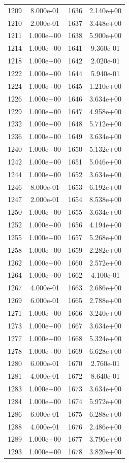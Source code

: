 \documentclass[12pt]{article}
\begin{document}
\begin{longtable}{@{}cccc@{}}
1209 & 8.000e-01 & 1636 & 2.140e+00 \\
1210 & 2.000e-01 & 1637 & 3.448e+00 \\
1211 & 1.000e+00 & 1638 & 5.900e+00 \\
1214 & 1.000e+00 & 1641 & 9.360e-01 \\
1218 & 1.000e+00 & 1642 & 2.020e-01 \\
1222 & 1.000e+00 & 1644 & 5.940e-01 \\
1224 & 1.000e+00 & 1645 & 1.210e+00 \\
1226 & 1.000e+00 & 1646 & 3.634e+00 \\
1229 & 1.000e+00 & 1647 & 4.958e+00 \\
1232 & 1.000e+00 & 1648 & 5.712e+00 \\
1236 & 1.000e+00 & 1649 & 3.634e+00 \\
1240 & 1.000e+00 & 1650 & 5.132e+00 \\
1242 & 1.000e+00 & 1651 & 5.046e+00 \\
1244 & 1.000e+00 & 1652 & 3.634e+00 \\
1246 & 8.000e-01 & 1653 & 6.192e+00 \\
1247 & 2.000e-01 & 1654 & 8.538e+00 \\
1250 & 1.000e+00 & 1655 & 3.634e+00 \\
1252 & 1.000e+00 & 1656 & 4.194e+00 \\
1255 & 1.000e+00 & 1657 & 5.268e+00 \\
1258 & 1.000e+00 & 1659 & 2.282e+00 \\
1262 & 1.000e+00 & 1660 & 2.572e+00 \\
1264 & 1.000e+00 & 1662 & 4.100e-01 \\
1267 & 4.000e-01 & 1663 & 2.686e+00 \\
1269 & 6.000e-01 & 1665 & 2.788e+00 \\
1271 & 1.000e+00 & 1666 & 3.240e+00 \\
1273 & 1.000e+00 & 1667 & 3.634e+00 \\
1277 & 1.000e+00 & 1668 & 5.324e+00 \\
1278 & 1.000e+00 & 1669 & 6.628e+00 \\
1280 & 6.000e-01 & 1670 & 2.760e-01 \\
1281 & 4.000e-01 & 1672 & 8.640e-01 \\
1283 & 1.000e+00 & 1673 & 3.634e+00 \\
1284 & 1.000e+00 & 1674 & 5.972e+00 \\
1286 & 6.000e-01 & 1675 & 6.288e+00 \\
1288 & 4.000e-01 & 1676 & 2.486e+00 \\
1289 & 1.000e+00 & 1677 & 3.796e+00 \\
1293 & 1.000e+00 & 1678 & 3.820e+00 \\

\bottomrule
\end{longtable}
\end{document}
